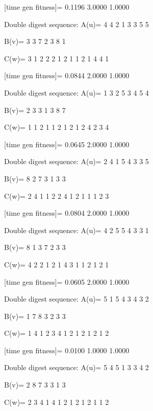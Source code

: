 [time gen fitness]=
    0.1196    3.0000    1.0000

Double digest sequence:
A(u)=
     4     4     2     1     3     3     5     5

B(v)=
     3     3     7     2     3     8     1

C(w)=
     3     1     2     2     2     1     2     1     1     2     1     4     4     1

[time gen fitness]=
    0.0844    2.0000    1.0000

Double digest sequence:
A(u)=
     1     3     2     5     3     4     5     4

B(v)=
     2     3     3     1     3     8     7

C(w)=
     1     1     2     1     1     2     1     2     1     2     4     2     3     4

[time gen fitness]=
    0.0645    2.0000    1.0000

Double digest sequence:
A(u)=
     2     4     1     5     4     3     3     5

B(v)=
     8     2     7     3     1     3     3

C(w)=
     2     4     1     1     2     2     4     1     2     1     1     1     2     3

[time gen fitness]=
    0.0804    2.0000    1.0000

Double digest sequence:
A(u)=
     4     2     5     5     4     3     3     1

B(v)=
     8     1     3     7     2     3     3

C(w)=
     4     2     2     1     2     1     4     3     1     1     2     1     2     1

[time gen fitness]=
    0.0605    2.0000    1.0000

Double digest sequence:
A(u)=
     5     1     5     4     3     4     3     2

B(v)=
     1     7     8     3     2     3     3

C(w)=
     1     4     1     2     3     4     1     2     1     2     1     2     1     2

[time gen fitness]=
    0.0100    1.0000    1.0000

Double digest sequence:
A(u)=
     5     4     5     1     3     3     4     2

B(v)=
     2     8     7     3     3     1     3

C(w)=
     2     3     4     1     4     1     2     1     2     1     2     1     1     2

